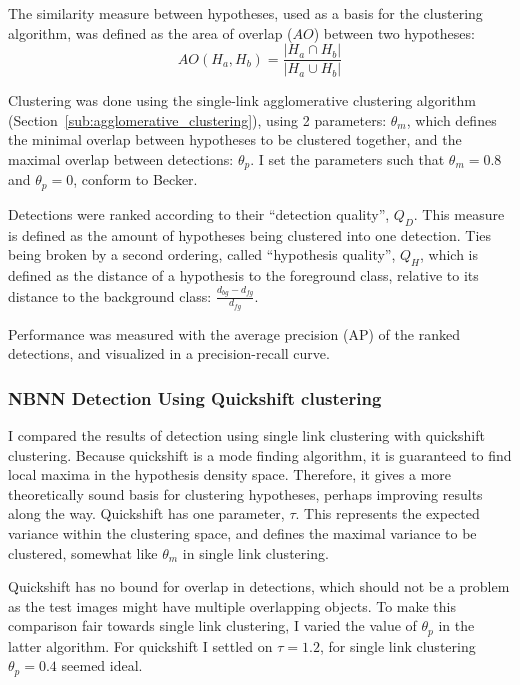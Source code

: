 The similarity measure between hypotheses, used as a basis for the clustering algorithm, was defined as the area of overlap ($AO$) between two hypotheses:
\begin{equation}
    AO(H_a, H_b)= \frac{|H_a\cap H_b|}{|H_a\cup H_b|}
\end{equation}

Clustering was done using the single-link agglomerative clustering algorithm (Section~\ref{sub:agglomerative_clustering}), using 2 parameters: $\theta_m$, which defines the minimal overlap between hypotheses to be clustered together, and the maximal overlap between detections: $\theta_p$. I set the parameters such that $\theta_m = 0.8$ and $\theta_p = 0$, conform to Becker.

Detections were ranked according to their ``detection quality'', $Q_D$. This measure is defined as the amount of hypotheses being clustered into one detection. Ties being broken by a second ordering, called ``hypothesis quality'', $Q_H$, which is defined as the distance of a hypothesis to the foreground class, relative to its distance to the background class: $\frac{d_{bg} - d_{fg}}{d_{fg}}$. 

Performance was measured with the average precision (AP) of the ranked detections, and visualized in a precision-recall curve.

\subsubsection{NBNN Detection Using Quickshift clustering} %
\label{sub:nbnn_detection_using_quickshift_clustering}


I compared the results of detection using single link clustering with quickshift clustering. Because quickshift is a mode finding algorithm, it is guaranteed to find local maxima in the hypothesis density space. Therefore, it gives a more theoretically sound basis for clustering hypotheses, perhaps improving results along the way. Quickshift has one parameter, $\tau$. This represents the expected variance within the clustering space, and defines the maximal variance to be clustered, somewhat like $\theta_m$ in single link clustering.

Quickshift has no bound for overlap in detections, which should not be a problem as the test images might have multiple overlapping objects. To make this comparison fair towards single link clustering, I varied the value of $\theta_p$ in the latter algorithm. For quickshift I settled on $\tau = 1.2$, for single link clustering $\theta_p = 0.4$ seemed ideal.

